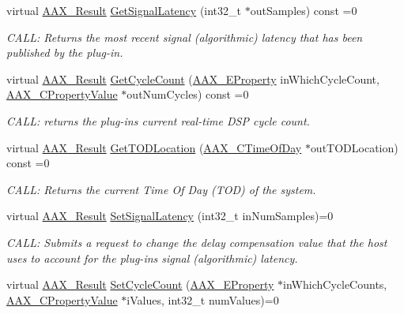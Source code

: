 \begin{DoxyCompactItemize}
virtual \mbox{\hyperlink{a00392_a4d8f69a697df7f70c3a8e9b8ee130d2f}{A\+A\+X\+\_\+\+Result}} \mbox{\hyperlink{a01637_ae4a19f971e0884aee6802ef0b3e0a020}{Get\+Signal\+Latency}} (int32\+\_\+t $\ast$out\+Samples) const =0
\begin{DoxyCompactList}\small\item\em C\+A\+LL\+: Returns the most recent signal (algorithmic) latency that has been published by the plug-\/in. \end{DoxyCompactList}\item 
virtual \mbox{\hyperlink{a00392_a4d8f69a697df7f70c3a8e9b8ee130d2f}{A\+A\+X\+\_\+\+Result}} \mbox{\hyperlink{a01637_a37c235cb6a27eab95686a009edeffabe}{Get\+Cycle\+Count}} (\mbox{\hyperlink{a00662_a13e384f22825afd3db6d68395b79ce0d}{A\+A\+X\+\_\+\+E\+Property}} in\+Which\+Cycle\+Count, \mbox{\hyperlink{a00392_ab247c0d8686c14e05cbb567ef276f249}{A\+A\+X\+\_\+\+C\+Property\+Value}} $\ast$out\+Num\+Cycles) const =0
\begin{DoxyCompactList}\small\item\em C\+A\+LL\+: returns the plug-\/in\textquotesingle{}s current real-\/time D\+SP cycle count. \end{DoxyCompactList}\item 
virtual \mbox{\hyperlink{a00392_a4d8f69a697df7f70c3a8e9b8ee130d2f}{A\+A\+X\+\_\+\+Result}} \mbox{\hyperlink{a01637_af34fa72c0e4043d5746adcf54e2299d7}{Get\+T\+O\+D\+Location}} (\mbox{\hyperlink{a00392_a46542a1dcccdcc3b4260a9926edf8a2a}{A\+A\+X\+\_\+\+C\+Time\+Of\+Day}} $\ast$out\+T\+O\+D\+Location) const =0
\begin{DoxyCompactList}\small\item\em C\+A\+LL\+: Returns the current Time Of Day (T\+OD) of the system. \end{DoxyCompactList}\item 
virtual \mbox{\hyperlink{a00392_a4d8f69a697df7f70c3a8e9b8ee130d2f}{A\+A\+X\+\_\+\+Result}} \mbox{\hyperlink{a01637_aee931a52f15789d1b6a4e78cfd4f4961}{Set\+Signal\+Latency}} (int32\+\_\+t in\+Num\+Samples)=0
\begin{DoxyCompactList}\small\item\em C\+A\+LL\+: Submits a request to change the delay compensation value that the host uses to account for the plug-\/in\textquotesingle{}s signal (algorithmic) latency. \end{DoxyCompactList}\item 
virtual \mbox{\hyperlink{a00392_a4d8f69a697df7f70c3a8e9b8ee130d2f}{A\+A\+X\+\_\+\+Result}} \mbox{\hyperlink{a01637_a452f047d471518a0ff5221887fd387df}{Set\+Cycle\+Count}} (\mbox{\hyperlink{a00662_a13e384f22825afd3db6d68395b79ce0d}{A\+A\+X\+\_\+\+E\+Property}} $\ast$in\+Which\+Cycle\+Counts, \mbox{\hyperlink{a00392_ab247c0d8686c14e05cbb567ef276f249}{A\+A\+X\+\_\+\+C\+Property\+Value}} $\ast$i\+Values, int32\+\_\+t num\+Values)=0

\end{DoxyCompactItemize}

